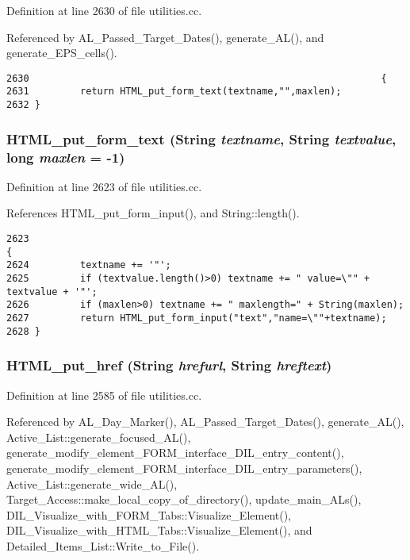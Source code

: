 Definition at line 2630 of file utilities.cc.

Referenced by AL\_\-Passed\_\-Target\_\-Dates(), generate\_\-AL(), and generate\_\-EPS\_\-cells().



\footnotesize\begin{verbatim}2630                                                              {
2631         return HTML_put_form_text(textname,"",maxlen);
2632 }
\end{verbatim}\normalsize 
{}
\subsubsection{ HTML\_\-put\_\-form\_\-text ({\bf String} {\em textname}, {\bf String} {\em textvalue}, long {\em maxlen} = -1)}\label{utilities_8cc_a76}




Definition at line 2623 of file utilities.cc.

References HTML\_\-put\_\-form\_\-input(), and String::length().



\footnotesize\begin{verbatim}2623                                                                                {
2624         textname += '"';
2625         if (textvalue.length()>0) textname += " value=\"" + textvalue + '"';
2626         if (maxlen>0) textname += " maxlength=" + String(maxlen);
2627         return HTML_put_form_input("text","name=\""+textname);
2628 }
\end{verbatim}\normalsize 
{}
\subsubsection{ HTML\_\-put\_\-href ({\bf String} {\em hrefurl}, {\bf String} {\em hreftext})}\label{utilities_8cc_a68}




Definition at line 2585 of file utilities.cc.

Referenced by AL\_\-Day\_\-Marker(), AL\_\-Passed\_\-Target\_\-Dates(), generate\_\-AL(), Active\_\-List::generate\_\-focused\_\-AL(), generate\_\-modify\_\-element\_\-FORM\_\-interface\_\-DIL\_\-entry\_\-content(), generate\_\-modify\_\-element\_\-FORM\_\-interface\_\-DIL\_\-entry\_\-parameters(), Active\_\-List::generate\_\-wide\_\-AL(), Target\_\-Access::make\_\-local\_\-copy\_\-of\_\-directory(), update\_\-main\_\-ALs(), DIL\_\-Visualize\_\-with\_\-FORM\_\-Tabs::Visualize\_\-Element(), DIL\_\-Visualize\_\-with\_\-HTML\_\-Tabs::Visualize\_\-Element(), and Detailed\_\-Items\_\-List::Write\_\-to\_\-File().



